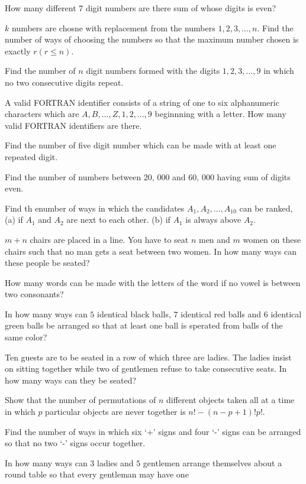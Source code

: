 \item How many different $7$ digit numbers are there sum of whose digits is even?
\item $k$ numbers are chosne with replacement from the numbers $1, 2, 3, \ldots, n$. Find the number of ways of choosing the
  numbers so that the maximum number chosen is exactly $r (r\leq n)$.
\item Find the number of $n$ digit numbers formed with the digits $1, 2, 3, \ldots, 9$ in which no two consecutive digits repeat.
\item A valid FORTRAN identifier consists of a string of one to six alphanumeric characters which are $A, B, \ldots, Z, 1, 2,
  \ldots, 9$ beginnning with a letter. How many valid FORTRAN identifiers are there.
\item Find the number of five digit number which can be made with at least one repeated digit.
\item Find the number of numbers between $20,\,000$ and $60,\,000$ having sum of digits even.
\item Find th enumber of ways in which the candidates $A_1, A_2, \ldots, A_{10}$ can be ranked, (a) if $A_1$ and $A_2$ are next to
  each other. (b) if $A_1$ is always above $A_2$.
\item $m + n$ chairs are placed in a line. You have to seat $n$ men and $m$ women on these chairs such that no man gets a seat
  between two women. In how many ways can these people be seated?
\item How many words can be made with the letters of the word  if no vowel is between two consonants?
\item In how many ways can $5$ identical black balls, $7$ identical red balls and $6$ identical green balls be arranged so that at
  least one ball is sperated from balls of the same color?
\item Ten guests are to be seated in a row of which three are ladies. The ladies insist on sitting together while two of gentlemen
  refuse to take consecutive seats. In how many ways can they be seated?
\item Show that the number of permutations of $n$ different objects taken all at a time in which $p$ particular objects are never
  together is $n! - (n - p + 1)!p!$.
\item Find the number of ways in which six `+' signs and four `-' signs can be arranged so that no two `-' signs occur together.
\item In how many ways can $3$ ladies and $5$ gentlemen arrange themselves about a round table so that every gentleman may have one
